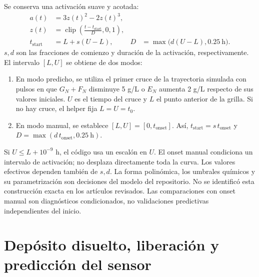 \documentclass[11pt,a4paper]{article}
\newcommand{\clip}{\operatorname{clip}}
\begin{document}
Se conserva una activación suave y acotada:
\begin{align}
a(t)&=3z(t)^2-2z(t)^3,\label{eq:gate}\\
z(t)&=\clip\left(\frac{t-t_{\mathrm{start}}}{D},0,1\right),\label{eq:z}\\
t_{\mathrm{start}}&=L+s(U-L),&
D&=\max\bigl(d(U-L),0.25\ \mathrm h\bigr).\label{eq:gateparams}
\end{align}
$s,d$ son las fracciones de comienzo y duración de la activación,
respectivamente. El intervalo $[L,U]$ se obtiene de dos modos:
\begin{enumerate}
\item En modo predicho, se utiliza el primer cruce de la trayectoria simulada
con pulsos en que $G_N+F_N$ disminuye 5 g/L o $E_N$ aumenta 2 g/L respecto
de sus valores iniciales. $U$ es el tiempo del cruce y $L$ el punto anterior
de la grilla. Si no hay cruce, el helper fija $L=U=t_0$.
\item En modo manual, se establece $[L,U]=[0,t_{\mathrm{onset}}]$.
Así, $t_{\mathrm{start}}=s\,t_{\mathrm{onset}}$ y
$D=\max(d\,t_{\mathrm{onset}},0.25\ \mathrm h)$.
\end{enumerate}
Si $U\le L+10^{-9}$ h, el código usa un escalón en $U$.
El onset manual condiciona un intervalo de activación; no desplaza directamente
toda la curva. Los valores efectivos dependen también de $s,d$.
La forma polinómica, los umbrales químicos y su parametrización son decisiones
del modelo del repositorio. No se identificó esta construcción exacta en
los artículos revisados. Las comparaciones con onset manual son diagnósticos
condicionados, no validaciones predictivas independientes del inicio.

\section{Depósito disuelto, liberación y predicción del sensor}
\end{document}
